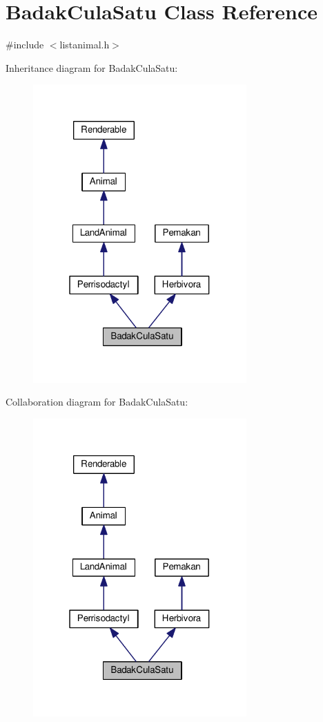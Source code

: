 \hypertarget{classBadakCulaSatu}{}\section{Badak\+Cula\+Satu Class Reference}
\label{classBadakCulaSatu}


{\ttfamily \#include $<$listanimal.\+h$>$}



Inheritance diagram for Badak\+Cula\+Satu\+:
\nopagebreak
\begin{figure}[H]
\begin{center}
\leavevmode
\includegraphics[width=232pt]{classBadakCulaSatu__inherit__graph}
\end{center}
\end{figure}


Collaboration diagram for Badak\+Cula\+Satu\+:
\nopagebreak
\begin{figure}[H]
\begin{center}
\leavevmode
\includegraphics[width=232pt]{classBadakCulaSatu__coll__graph}
\end{center}
\end{figure}
